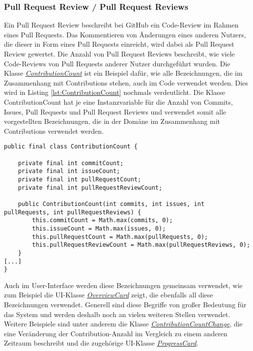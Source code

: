 \documentclass[12pt]{article}
\begin{document}
\subsubsection*{Pull Request Review / Pull Request Reviews}
\label{sec:PullRequestReviews}
Ein Pull Request Review beschreibt bei GitHub ein Code-Review im Rahmen eines Pull Requests.
Das Kommentieren von Änderungen eines anderen Nutzers, die dieser in Form eines Pull Requests einreicht, wird dabei als Pull Request Review gewertet.
Die Anzahl von Pull Request Reviews beschreibt, wie viele Code-Reviews von Pull Requests anderer Nutzer durchgeführt wurden.
\newline
\newline
Die Klasse \href{https://github.com/lukaspanni/OpenSourceStats/blob/main/app/src/main/java/de/lukaspanni/opensourcestats/data/ContributionCount.java}{\textit{ContributionCount}} ist ein Beispiel dafür, wie alle Bezeichnungen, die im Zusammenhang mit Contributions stehen, auch im Code verwendet werden. Dies wird in Listing \ref{lst:ContributionCount} nochmals verdeutlicht. Die Klasse ContributionCount hat je eine Instanzvariable für die Anzahl von Commits, Issues, Pull Requests und Pull Request Reviews und verwendet somit alle vorgestellten Bezeichnungen, die in der Domäne im Zusammenhang mit Contributions verwendet werden.
\begin{lstlisting}[caption={Auszug aus der Klasse ContributionCount}, captionpos=b, label={lst:ContributionCount}]
public final class ContributionCount {

    private final int commitCount;
    private final int issueCount;
    private final int pullRequestCount;
    private final int pullRequestReviewCount;

    public ContributionCount(int commits, int issues, int pullRequests, int pullRequestReviews) {
        this.commitCount = Math.max(commits, 0);
        this.issueCount = Math.max(issues, 0);
        this.pullRequestCount = Math.max(pullRequests, 0);
        this.pullRequestReviewCount = Math.max(pullRequestReviews, 0);
    }
[...]
}
\end{lstlisting}
Auch im User-Interface werden diese Bezeichnungen gemeinsam verwendet, wie zum Beispiel die UI-Klasse \href{https://github.com/lukaspanni/OpenSourceStats/blob/main/app/src/main/java/de/lukaspanni/opensourcestats/ui/custom_elements/card/OverviewCard.java}{\textit{OverviewCard}} zeigt, die ebenfalls all diese Bezeichnungen verwendet.
\newline
Generell sind diese Begriffe von großer Bedeutung für das System und werden deshalb noch an vielen weiteren Stellen verwendet.
Weitere Beispiele sind unter anderem die Klasse \href{https://github.com/lukaspanni/OpenSourceStats/blob/main/app/src/main/java/de/lukaspanni/opensourcestats/data/ContributionCountChange.java}{\textit{ContributionCountChange}}, die eine Veränderung der Contribution-Anzahl im Vergleich zu einem anderen Zeitraum beschreibt und die zugehörige UI-Klasse \href{https://github.com/lukaspanni/OpenSourceStats/blob/main/app/src/main/java/de/lukaspanni/opensourcestats/ui/custom_elements/card/ProgressCard.java}{\textit{ProgressCard}}.
\end{document}
